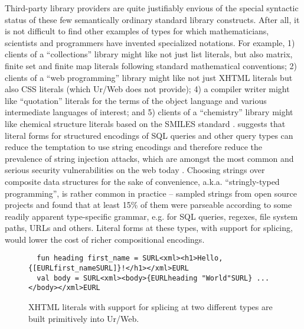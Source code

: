 \documentclass[acmsmall,10pt,review,anonymous]{acmart}\settopmatter{printfolios=true}
\begin{document}
Third-party library providers are quite justifiably envious of the special syntactic status of these few semantically ordinary standard library constructs. After all, it is not difficult to find other examples of types for which mathematicians, scientists and programmers have invented specialized notations. For example, 1) clients of a ``collections'' library might like not just list literals, but also matrix, finite set and finite map literals following standard mathematical conventions; 2) clients of a ``web programming'' library might like not just XHTML literals but also CSS literals (which Ur/Web does not provide); 4) a compiler writer might like ``quotation'' literals for the terms of the object language and various intermediate languages of interest; and 5) clients of a ``chemistry'' library might like chemical structure literals based on the SMILES standard \cite{anderson1987smiles}. \citet{Bravenboer:2007:PIA:1289971.1289975} suggests that literal forms for structured encodings of SQL queries and other query types can reduce the temptation to use string encodings and therefore reduce the prevalence of string injection attacks, which are amongst the most common and serious security vulnerabilities on the web today \cite{owasp2017}. Choosing strings over composite data structures for the sake of convenience, a.k.a. ``stringly-typed programming'', is rather common in practice -- \citet{TSLs} sampled strings from open source projects and found that at least 15\% of them were parseable according to some readily apparent type-specific grammar, e.g. for SQL queries, regexes, file system paths, URLs and others. Literal forms at these types, with support for splicing, would lower the cost of richer compositional encodings.%

\begin{figure}
\vspace{-2px}
\begin{lstlisting}
  fun heading first_name = SURL<xml><h1>Hello, {[EURLfirst_nameSURL]}!</h1></xml>EURL
  val body = SURL<xml><body>{EURLheading "World"SURL} ...</body></xml>EURL
\end{lstlisting}
\vspace{-10px}
\caption{XHTML literals with support for splicing at two different types are built primitively into Ur/Web.}
\vspace{-7px}
\label{fig:urweb}
\end{figure}
\end{document}
